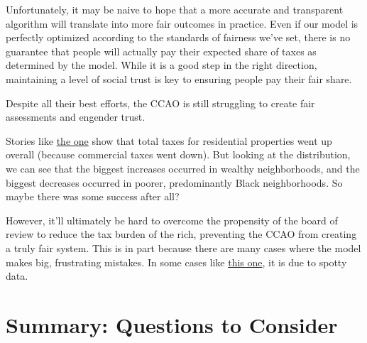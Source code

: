 \documentclass[
  letterpaper,
  DIV=11,
  numbers=noendperiod]{scrreprt}
\begin{document}
Unfortunately, it may be naive to hope that a more accurate and
transparent algorithm will translate into more fair outcomes in
practice. Even if our model is perfectly optimized according to the
standards of fairness we've set, there is no guarantee that people will
actually pay their expected share of taxes as determined by the model.
While it is a good step in the right direction, maintaining a level of
social trust is key to ensuring people pay their fair share.

Despite all their best efforts, the CCAO is still struggling to create
fair assessments and engender trust.

Stories like
\href{https://www.axios.com/local/chicago/2022/12/01/why-chicagos-property-tax-bills-so-high}{the
one} show that total taxes for residential properties went up overall
(because commercial taxes went down). But looking at the distribution,
we can see that the biggest increases occurred in wealthy neighborhoods,
and the biggest decreases occurred in poorer, predominantly Black
neighborhoods. So maybe there was some success after all?

However, it'll ultimately be hard to overcome the propensity of the
board of review to reduce the tax burden of the rich, preventing the
CCAO from creating a truly fair system. This is in part because there
are many cases where the model makes big, frustrating mistakes. In some
cases like
\href{https://www.axios.com/local/chicago/2023/05/22/cook-county-property-tax-appeal-process}{this
one}, it is due to spotty data.

\section{Summary: Questions to
Consider}\label{summary-questions-to-consider}
\end{document}
